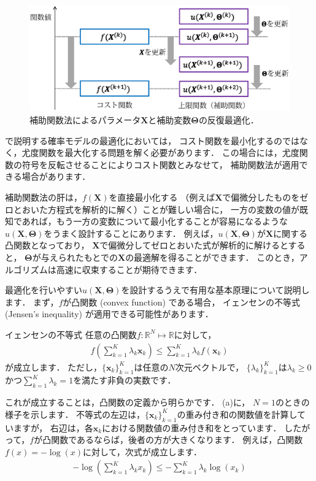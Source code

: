 \begin{figure}[t]
\centering
\includegraphics[width=.98\linewidth]{sections/optimization/aux_function}
\vspace{-1mm}
\caption{補助関数法によるパラメータ$\bm{X}$と補助変数$\bm\Theta$の反復最適化．}
\label{fig:aux_function}
\end{figure}

で説明する確率モデルの最適化においては，
コスト関数を最小化するのではなく，尤度関数を最大化する問題を解く必要があります．
この場合には，尤度関数の符号を反転させることによりコスト関数とみなせて，
補助関数法が適用できる場合があります．

補助関数法の肝は，$f(\bm{X})$を直接最小化する
（例えば$\bm{X}$で偏微分したものをゼロとおいた方程式を解析的に解く）ことが難しい場合に，
一方の変数の値が既知であれば，もう一方の変数について最小化することが容易になるような
$u(\bm{X}, \bm\Theta)$をうまく設計することにあります．
例えば，$u(\bm{X}, \bm\Theta)$が$\bm{X}$に関する凸関数となっており，
$\bm{X}$で偏微分してゼロとおいた式が解析的に解けるとすると，
$\bm\Theta$が与えられたもとでの$\bm{X}$の最適解を得ることができます．
このとき，アルゴリズムは高速に収束することが期待できます．

最適化を行いやすい$u(\bm{X}, \bm\Theta)$を設計するうえで有用な基本原理について説明します．
まず，$f$が凸関数 (convex function) である場合，
イェンセンの不等式 (Jensen's inequality) が適用できる可能性があります．
\begin{theobox}{イェンセンの不等式}
\label{jensen}
任意の凸関数$f:\mathbb{R}^N \mapsto \mathbb{R}$に対して，
\begin{align}
f\left(\sum_{k=1}^K \lambda_k \bm{x}_k\right) \le \sum_{k=1}^K \lambda_k f(\bm{x}_k)
\label{eq:jensen_inequality}
\end{align}
が成立します．
ただし，$\{\bm{x}_k\}_{k=1}^K$は任意の$N$次元ベクトルで，
$\{\lambda_k\}_{k=1}^K$は$\lambda_k \ge 0$かつ$\sum_{k=1}^K \lambda_k = 1$を満たす非負の実数です．
\end{theobox}
これが成立することは，凸関数の定義から明らかです．
(a)に，
$N=1$のときの様子を示します．
不等式の左辺は，$\{\bm{x}_k\}_{k=1}^K$の重み付き和の関数値を計算していますが，
右辺は，各$\bm{x}_k$における関数値の重み付き和をとっています．
したがって，$f$が凸関数であるならば，後者の方が大きくなります．
例えば，凸関数$f(x) = - \log (x)$に対して，次式が成立します．
\begin{align}
- \log \left(\sum_{k=1}^K \lambda_k x_k\right) \le - \sum_{k=1}^K \lambda_k \log (x_k)
\end{align}

